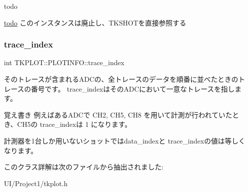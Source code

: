 \begin{DoxyRefDesc}{todo}
\item[\hyperlink{todo__todo000006}{todo}]このインスタンスは廃止し、\+T\+K\+S\+H\+O\+Tを直接参照する \end{DoxyRefDesc}
\mbox{\label{class_t_k_p_l_o_t_1_1_p_l_o_t_i_n_f_o_a48ef8281322bf15a1e48cca923d34eeb}} 
\subsubsection{\texorpdfstring{trace\+\_\+index}{trace\_index}}
{\footnotesize\ttfamily int T\+K\+P\+L\+O\+T\+::\+P\+L\+O\+T\+I\+N\+F\+O\+::trace\+\_\+index}



そのトレースが含まれる\+A\+D\+Cの、全トレースのデータを順番に並べたときのトレースの番号です。 trace\+\_\+indexはその\+A\+D\+Cにおいて一意なトレースを指します。 

\begin{DoxyNote}{覚え書き}
例えばある\+A\+D\+Cで C\+H2, C\+H5, C\+H8 を用いて計測が行われていたとき、\+C\+H5の trace\+\_\+indexは 1 になります。 

計測器を1台しか用いないショットではdata\+\_\+indexと trace\+\_\+indexの値は等しくなります。 
\end{DoxyNote}


このクラス詳解は次のファイルから抽出されました\+:\begin{DoxyCompactItemize}
\item 
U\+I/\+Project1/tkplot.\+h\end{DoxyCompactItemize}
